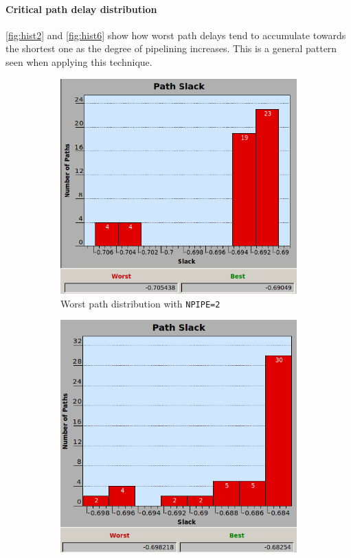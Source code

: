 \paragraph{Critical path delay distribution}
\autoref{fig:hist2} and \autoref{fig:hist6} show how worst path delays tend to accumulate towards the shortest one as the degree of pipelining increases. This is a general pattern seen when applying this technique.
\begin{figure}[htbp]
    \begin{subfigure}{0.5\textwidth}
	   \centering
	   \includegraphics[width=\textwidth]{chapter1/images/npipe2.png}
	   \caption{Worst path distribution with \texttt{NPIPE=2}}
	   \label{fig:hist2}
    \end{subfigure}
    \begin{subfigure}{0.5\textwidth}
        \centering
	    \includegraphics[width=\textwidth]{chapter1/images/npipe6.png}

\end{subfigure}
\end{figure}
